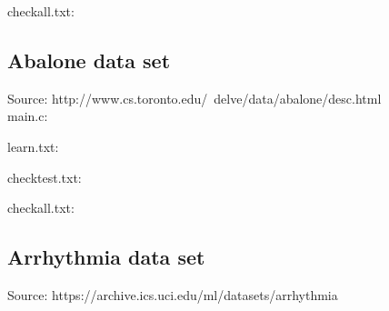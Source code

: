 checkall.txt:\\
\begin{scriptsize}
\begin{ttfamily}

\end{ttfamily}
\end{scriptsize}

\subsection{Abalone data set}

Source: http://www.cs.toronto.edu/~delve/data/abalone/desc.html \\

main.c:\\
\begin{scriptsize}
\begin{ttfamily}

\end{ttfamily}
\end{scriptsize}

learn.txt:\\
\begin{scriptsize}
\begin{ttfamily}

\end{ttfamily}
\end{scriptsize}

checktest.txt:\\
\begin{scriptsize}
\begin{ttfamily}

\end{ttfamily}
\end{scriptsize}

checkall.txt:\\
\begin{scriptsize}
\begin{ttfamily}

\end{ttfamily}
\end{scriptsize}

\subsection{Arrhythmia data set}

Source: https://archive.ics.uci.edu/ml/datasets/arrhythmia \\

